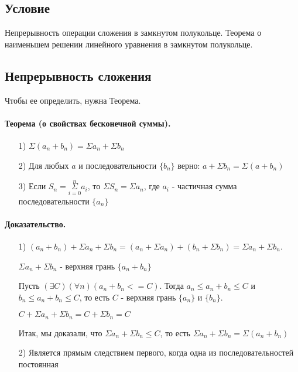 \documentclass{report}
\begin{document}
\subsection{Условие}
Непрерывность операции сложения в замкнутом полукольце. Теорема о наименьшем
решении линейного уравнения в замкнутом полукольце.

\subsection{Непрерывность сложения}
Чтобы ее определить, нужна Теорема.

\paragraph*{Теорема (о свойствах бесконечной суммы).}
\begin{itemize}
    \item[1)] $\Sigma(a_n + b_n) = \Sigma a_n + \Sigma b_n$
    \item[2)] Для любых $a$ и последовательности $\{b_n\}$ верно:\newline
        $a + \Sigma b_n = \Sigma(a + b_n)$
    \item[3)] Если $S_n = \underset{i=0}{\overset{n}{\Sigma}} a_i$, то $\Sigma S_n = \Sigma a_n$, где
        $a_i$ - частичная сумма последовательности $\{a_n\}$
\end{itemize}
\paragraph*{Доказательство.}
\begin{itemize}
    \item[1)] $(a_n + b_n) + \Sigma a_n + \Sigma b_n = (a_n + \Sigma a_n) + (b_n + \Sigma b_n) =
            \Sigma a_n + \Sigma b_n$.

        $\Sigma a_n + \Sigma b_n$ - верхняя грань $\{a_n + b_n\}$

        Пусть $(\exists C)(\forall n)(a_n + b_n <= C)$. Тогда $a_n \leq a_n + b_n \leq C$ и
        $b_n \leq a_n + b_n \leq C$, то есть $C$ - верхняя грань $\{a_n\}$ и $\{b_n\}$.

        $C + \Sigma a_n + \Sigma b_n = C + \Sigma b_n = C$

        Итак, мы доказали, что $\Sigma a_n + \Sigma b_n \leq C$, то есть
        $\Sigma a_n + \Sigma b_n = \Sigma (a_n + b_n)$
    \item[2)] Является прямым следствием первого, когда одна из последовательностей постоянная
\end{itemize}
\end{document}
